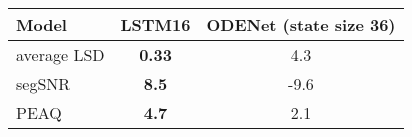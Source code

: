 \newcommand{\modelNameCellWidth}{1.8cm}
    \begin{tabular}{@{} l | c c @{}}
        \toprule
        Model & LSTM16 & ODENet (state size 36) \\ \midrule
        average \acs{LSD} & \textbf{0.33} & 4.3 \\
        segSNR  & \textbf{8.5} & -9.6  \\
        PEAQ     & \textbf{4.7} & 2.1 \\ \bottomrule
    \end{tabular}%
    